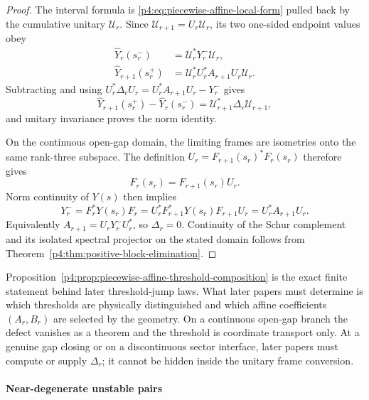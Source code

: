 \documentclass[12pt,a4paper]{article}
\begin{document}
\begin{proof}
The interval formula is
\eqref{p4:eq:piecewise-affine-local-form} pulled back by the cumulative
unitary \(\mathcal U_r\).  Since
\(\mathcal U_{r+1}=U_r\mathcal U_r\), its two one-sided endpoint values obey
\[
\begin{aligned}
\widehat Y_r(s_r^-)
&=\mathcal U_r^*Y_r^-\mathcal U_r,\\
\widehat Y_{r+1}(s_r^+)
&=\mathcal U_r^*U_r^*A_{r+1}U_r\mathcal U_r .
\end{aligned}
\]
Subtracting and using
\(U_r^*\Delta_rU_r=U_r^*A_{r+1}U_r-Y_r^-\) gives
\[
\widehat Y_{r+1}(s_r^+)-\widehat Y_r(s_r^-)
=\mathcal U_{r+1}^*\Delta_r\mathcal U_{r+1},
\]
and unitary invariance proves the norm identity.

On the continuous open-gap domain, the limiting frames are isometries onto
the same rank-three subspace.  The definition
\(U_r=F_{r+1}(s_r)^*F_r(s_r)\) therefore gives
\[
F_r(s_r)=F_{r+1}(s_r)U_r.
\]
Norm continuity of \(Y(s)\) then implies
\[
Y_r^-
=F_r^*Y(s_r)F_r
=U_r^*F_{r+1}^*Y(s_r)F_{r+1}U_r
=U_r^*A_{r+1}U_r.
\]
Equivalently \(A_{r+1}=U_rY_r^-U_r^*\), so
\(\Delta_r=0\).  Continuity of the Schur complement and its isolated
spectral projector on the stated domain follows from
Theorem~\ref{p4:thm:positive-block-elimination}.
\end{proof}

\begin{remark}[Interpretation]
\label{p4:rem:piecewise-affine-interpretation}
Proposition~\ref{p4:prop:piecewise-affine-threshold-composition} is the exact
finite statement behind later threshold-jump laws.  What later papers must
determine is which thresholds are physically distinguished and which affine
coefficients \((A_r,B_r)\) are selected by the geometry.  On a continuous
open-gap branch the defect vanishes as a theorem and the threshold is
coordinate transport only.  At a genuine gap closing or on a discontinuous
sector interface, later papers must compute or supply \(\Delta_r\); it cannot
be hidden inside the unitary frame conversion.
\end{remark}



\paragraph{Near-degenerate unstable pairs}
\label{p4:sec:part2-near-degenerate-unstable-pairs}
\end{document}
